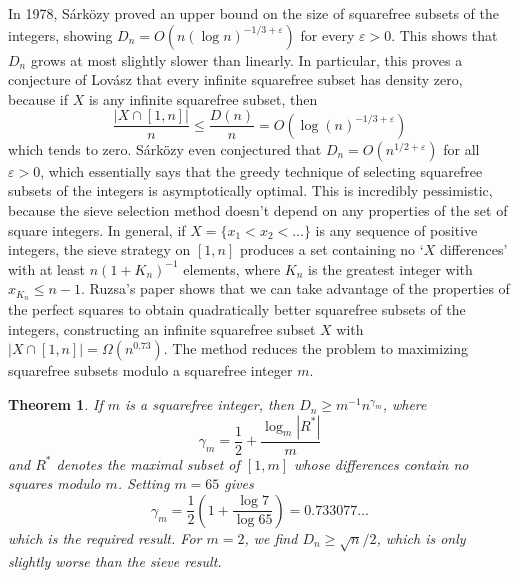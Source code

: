 \documentclass{article}
\theoremstyle{plain}
\theoremstyle{plain}
\newtheorem{theorem}{Theorem}
\begin{document}
In 1978, S\'{a}rk\"{o}zy proved an upper bound on the size of squarefree subsets of the integers, showing $D_n = O(n (\log n)^{-1/3 + \varepsilon})$ for every $\varepsilon > 0$. This shows that $D_n$ grows at most slightly slower than linearly. In particular, this proves a conjecture of Lov\'{a}sz that every infinite squarefree subset has density zero, because if $X$ is any infinite squarefree subset, then
%
\[ \frac{|X \cap [1,n]|}{n} \leq \frac{D(n)}{n} = O(\log(n)^{-1/3 + \varepsilon}) \]
%
which tends to zero. S\'{a}rk\"{o}zy even conjectured that $D_n = O(n^{1/2 + \varepsilon})$ for all $\varepsilon > 0$, which essentially says that the greedy technique of selecting squarefree subsets of the integers is asymptotically optimal. This is incredibly pessimistic, because the sieve selection method doesn't depend on any properties of the set of square integers. In general, if $X = \{ x_1 < x_2 < \dots \}$ is any sequence of positive integers, the sieve strategy on $[1,n]$ produces a set containing no `$X$ differences' with at least $n (1 + K_n)^{-1}$ elements, where $K_n$ is the greatest integer with $x_{K_n} \leq n - 1$. Ruzsa's paper shows that we can take advantage of the properties of the perfect squares to obtain quadratically better squarefree subsets of the integers, constructing an infinite squarefree subset $X$ with $|X \cap [1,n]| = \Omega(n^{0.73})$. The method reduces the problem to maximizing squarefree subsets modulo a squarefree integer $m$.

\begin{theorem}
    If $m$ is a squarefree integer, then $D_n \geq m^{-1} n^{\gamma_m}$, where
    \[ \gamma_m = \frac{1}{2} + \frac{\log_m |R^*|}{m} \]
    and $R^*$ denotes the maximal subset of $[1,m]$ whose differences contain no squares modulo $m$. Setting $m = 65$ gives
    \[ \gamma_m = \frac{1}{2} \left( 1 + \frac{\log 7}{\log 65} \right) = 0.733077 \dots \]
    which is the required result. For $m = 2$, we find $D_n \geq \sqrt{n}/2$, which is only slightly worse than the sieve result.
\end{theorem}
\end{document}
